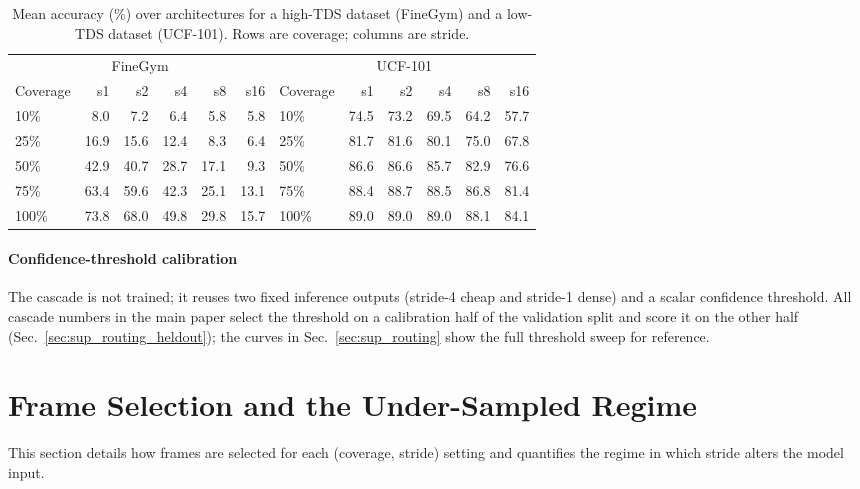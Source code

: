 \documentclass[a4paper, 10pt, conference, onecolumn]{ieeeconf}
\newcommand{\tabtight}{\setlength{\tabcolsep}{3.5pt}\renewcommand{\arraystretch}{1.12}}
\newcommand{\TDS}{\textsc{TDS}}
\begin{document}
\begin{table}[!htbp]
\centering
\caption{Mean accuracy (\%) over architectures for a high-\TDS{} dataset (FineGym) and a low-\TDS{} dataset (UCF-101). Rows are coverage; columns are stride.}
\label{tab:coverage_stride_examples}
\scriptsize\tabtight
\begin{adjustbox}{max width=\textwidth}
\begin{tabular}{l rrrrr @{\hskip18pt} l rrrrr}
\toprule
\multicolumn{6}{c}{FineGym} & \multicolumn{6}{c}{UCF-101} \\
\cmidrule(lr){1-6}\cmidrule(lr){7-12}
Coverage & s1 & s2 & s4 & s8 & s16 & Coverage & s1 & s2 & s4 & s8 & s16 \\
\midrule
10\%  &  8.0 &  7.2 &  6.4 &  5.8 &  5.8 & 10\%  & 74.5 & 73.2 & 69.5 & 64.2 & 57.7 \\
25\%  & 16.9 & 15.6 & 12.4 &  8.3 &  6.4 & 25\%  & 81.7 & 81.6 & 80.1 & 75.0 & 67.8 \\
50\%  & 42.9 & 40.7 & 28.7 & 17.1 &  9.3 & 50\%  & 86.6 & 86.6 & 85.7 & 82.9 & 76.6 \\
75\%  & 63.4 & 59.6 & 42.3 & 25.1 & 13.1 & 75\%  & 88.4 & 88.7 & 88.5 & 86.8 & 81.4 \\
100\% & 73.8 & 68.0 & 49.8 & 29.8 & 15.7 & 100\% & 89.0 & 89.0 & 89.0 & 88.1 & 84.1 \\
\bottomrule
\end{tabular}
\end{adjustbox}
\end{table}

\paragraph{Confidence-threshold calibration}
The cascade is not trained; it reuses two fixed inference outputs (stride-4 cheap and stride-1 dense) and a scalar confidence threshold. All cascade numbers in the main paper select the threshold on a calibration half of the validation split and score it on the other half (Sec.~\ref{sec:sup_routing_heldout}); the curves in Sec.~\ref{sec:sup_routing} show the full threshold sweep for reference.

\section{Frame Selection and the Under-Sampled Regime}
\label{sec:sup_padding}

This section details how frames are selected for each (coverage, stride)
setting and quantifies the regime in which stride alters the model input.
\end{document}
